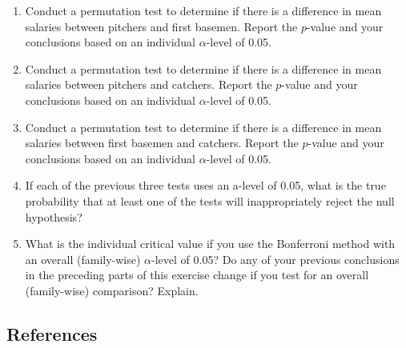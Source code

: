 \documentclass[
]{report}
\begin{document}
\begin{enumerate}
\begin{enumerate}
  \item Conduct a permutation test to determine if there is a difference in mean salaries between pitchers and first basemen. Report the $\scriptstyle p$-value and your conclusions based on an individual $\scriptstyle \alpha$-level of 0.05.
    \item Conduct a permutation test to determine if there is a difference in mean salaries between pitchers and catchers. Report the $\scriptstyle p$-value and your conclusions based on an individual $\scriptstyle \alpha$-level of 0.05.
    \item Conduct a permutation test to determine if there is a difference in mean salaries between first basemen and catchers. Report the $\scriptstyle p$-value and your conclusions based on an individual $\scriptstyle \alpha$-level of 0.05.
    \item If each of the previous three tests uses an a-level of 0.05, what is the true probability that at least one of the tests will inappropriately reject the null hypothesis?
    \item What is the individual critical value if you use the Bonferroni method with an overall (family-wise) $\scriptstyle \alpha$-level of 0.05? Do any of your previous conclusions in the preceding parts of this exercise change if you test for an overall (family-wise) comparison? Explain.
  \end{enumerate}
  
  
  
 \end{enumerate}

\hypertarget{references}{%
\subsection*{References}\label{references}}
\end{document}

